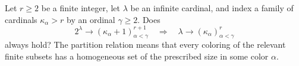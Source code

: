 Let $r\geq2$ be a finite integer, let $\lambda$ be an infinite cardinal, and index a family of cardinals $\kappa_\alpha>r$ by an ordinal $\gamma\geq2$. Does
\[
2^\lambda\longrightarrow(\kappa_\alpha+1)_{\alpha<\gamma}^{r+1}
\quad\Longrightarrow\quad
\lambda\longrightarrow(\kappa_\alpha)_{\alpha<\gamma}^{r}
\]
always hold? The partition relation means that every coloring of the relevant finite subsets has a homogeneous set of the prescribed size in some color $\alpha$.
